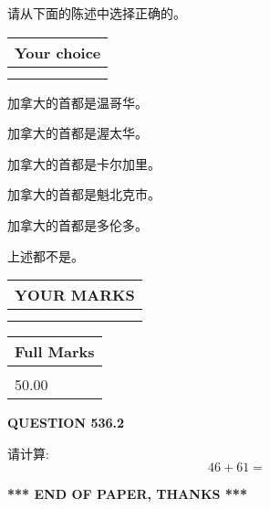 \documentclass{ctexart}
\begin{document}
  
请从下面的陈述中选择正确的。
  
  
\noindent\hspace{3.0in} \begin{tabular}{|l|}
\hline
Your choice \\
\hline
 \\ 
 \\ 
\hline
\end{tabular}
  
  
 
 
加拿大的首都是温哥华。
 
 
加拿大的首都是渥太华。
 
 
加拿大的首都是卡尔加里。
 
 
加拿大的首都是魁北克市。
 
 
加拿大的首都是多伦多。
 
 
 上述都不是。
 
 
  
\vspace{0.2in}
  
\noindent\begin{tabular}{|l|}
\hline
 YOUR MARKS  \\
\hline
 \\ 
 \\ 
\hline
\end{tabular}
\hspace{0.05in} \begin{tabular}{|l|}
\hline
 Full Marks  \\
\hline
 \\ 
50.00 \\
\hline
\end{tabular}
{\textbf{\Large{QUESTION
536.2 
}}}
  
  
 
请计算:
\begin{equation}
46 +  %
61 = \nonumber
\end{equation}
 

 

 
   
   
 \vspace{0.2in}
 
   
   
   
   
\vspace{1.0in} 
{\textbf{\large{ *** END OF PAPER, THANKS *** }}} 
   
\end{document}
